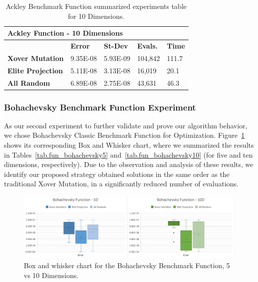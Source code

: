 \documentclass[graybox]{svmult}
\begin{document}
            \begin{table}[]
                \scriptsize
                \centering
                \caption{Ackley Benchmark Function summarized experiments table for 10 Dimensions.}\label{tab.fun_ackley10}
                \begin{tabular}{@{}lllll@{}}
                \toprule
                \multicolumn{5}{l}{\textbf{Ackley Function - 10 Dimensions}} \\ \midrule
                & \textbf{Error} & \textbf{St-Dev} & \textbf{Evals.} & \textbf{Time} \\
                \textbf{Xover Mutation} & 9.35E-08 & 5.93E-09 & 104,842 & 111.7 \\
                \textbf{Elite Projection} & 5.11E-08 & 3.13E-08 & 16,019 & 20.1 \\
                \textbf{All Random} & 6.89E-08 & 2.75E-08 & 43,631 & 46.3 \\ \bottomrule
                \end{tabular}
                \end{table}
            
            \FloatBarrier


        \subsubsection{Bohachevsky Benchmark Function Experiment}

            As our second experiment to further validate and prove our
            algorithm behavior, we chose Bohachevsky Classic Benchmark Function
            for Optimization. Figure~\ref{fig.fun_bohachevsky} shows its
            corresponding Box and Whisker chart, where we summarized the
            results in Tables~\ref{tab.fun_bohachevsky5} and~\ref{tab.fun_bohachevsky10} 
            (for five and ten dimensions, respectively). Due to the observation 
            and analysis of these results, we identify our proposed strategy 
            obtained solutions in the same order as the traditional Xover Mutation, 
            in a significantly reduced number of evaluations.

            \begin{figure}
                \includegraphics[width=0.99\linewidth, frame]{img/fig_fun_bohachevsky.pdf}
                \caption{Box and whisker chart for the Bohachevsky Benchmark Function, 5 vs 10 Dimensions.} \label{fig.fun_bohachevsky}
                \end{figure}
\end{document}
